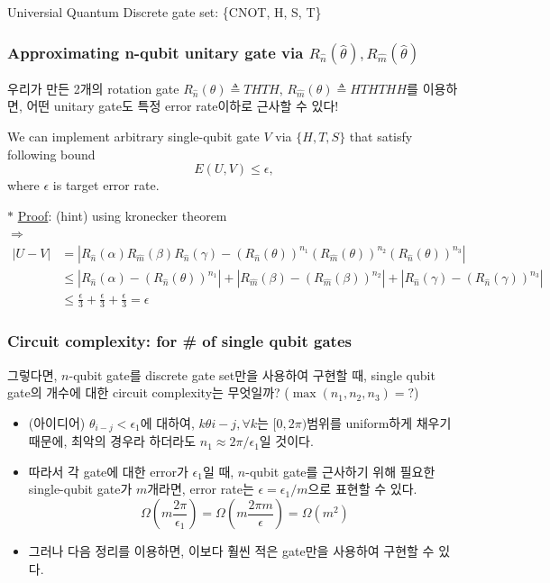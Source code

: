 \documentclass[9pt]{beamer}
\begin{document}
\begin{section}{Universial Quantum Discrete gate set: \{CNOT, H, S, T\}}
        \begin{frame}
            \frametitle{Approximating n-qubit unitary gate via ${R_{\hat n}}(\hat \theta), R_{\hat m}(\hat \theta)$}
            우리가 만든 2개의 rotation gate $R_{\hat n}(\theta) \triangleq THTH$, $R_{\hat m}(\theta) \triangleq HTHTHH$를 이용하면, 어떤 unitary gate도 특정 error rate이하로 근사할 수 있다!
            \begin{theorem}
                We can implement arbitrary single-qubit gate $V$ via $\{H, T, S\}$ that satisfy following bound
                $$ E(U, V) \leq \epsilon, $$
                where $\epsilon$ is target error rate.
            \end{theorem}
                \vspace{0.2cm}
                $\ast$ \underline{Proof}: (hint) using kronecker theorem
                \\$\Rightarrow$
                \vspace{1.2cm}
                $$\begin{aligned} |U - V| &= |R_{\hat n} (\alpha) R_{\hat m}(\beta) R_{\hat n} (\gamma) -  (R_{\hat n}(\theta))^{n_1}(R_{\hat m}(\theta))^{n_2}(R_{\hat n}(\theta))^{n_3}| \\ &\le |R_{\hat n} (\alpha) - (R_{\hat n}(\theta))^{n_1}| + |R_{\hat m} (\beta) - (R_{\hat m}(\beta))^{n_2}| + |R_{\hat n} (\gamma) - (R_{\hat n}(\gamma))^{n_3}|\\ &\le \frac{\epsilon}{3} +  \frac{\epsilon}{3} +  \frac{\epsilon}{3} = \epsilon \end{aligned} $$
                \vspace{-0.4cm}
        
        \end{frame}


        \begin{frame}
            \frametitle{Circuit complexity: for \# of single qubit gates}
            그렇다면, $n$-qubit gate를 discrete gate set만을 사용하여 구현할 때, single qubit gate의 개수에 대한 circuit complexity는 무엇일까? ($\max(n_1, n_2, n_3) = ?$)
            \begin{itemize}
                \item (아이디어) $\theta_{i-j} < \epsilon_1$에 대하여, $k\theta{i-j}, \forall k$는 $[0, 2\pi)$범위를 uniform하게 채우기 때문에, 최악의 경우라 하더라도 $n_1 \approx 2\pi/\epsilon_1$일 것이다.
                \item 따라서 각 gate에 대한 error가 $\epsilon_1$일 때, $n$-qubit gate를 근사하기 위해 필요한 single-qubit gate가 $m$개라면, error rate는 $\epsilon = \epsilon_1/m$으로 표현할 수 있다.
                $$ \Omega \left(m \frac{2\pi}{\epsilon_1}\right) = \Omega  \left(m \frac{ 2\pi m}{\epsilon}\right) = \Omega (m^2)$$
                \item 그러나 다음 정리를 이용하면, 이보다 훨씬 적은 gate만을 사용하여 구현할 수 있다.
            \end{itemize}
            

\end{frame}
\end{section}
\end{document}
